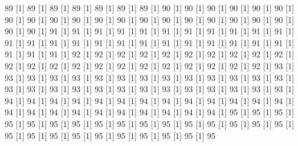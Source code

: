 \documentclass[12pt]{article}
\begin{document}
\begin{Schunk}
\begin{Soutput}
[1] 89%
[1] 89%
[1] 89%
[1] 89%
[1] 89%
[1] 89%
[1] 89%
[1] 90%
[1] 90%
[1] 90%
[1] 90%
[1] 90%
[1] 90%
[1] 90%
[1] 90%
[1] 90%
[1] 90%
[1] 90%
[1] 90%
[1] 90%
[1] 90%
[1] 90%
[1] 90%
[1] 90%
[1] 90%
[1] 90%
[1] 90%
[1] 90%
[1] 91%
[1] 91%
[1] 91%
[1] 91%
[1] 91%
[1] 91%
[1] 91%
[1] 91%
[1] 91%
[1] 91%
[1] 91%
[1] 91%
[1] 91%
[1] 91%
[1] 91%
[1] 91%
[1] 91%
[1] 91%
[1] 91%
[1] 91%
[1] 91%
[1] 91%
[1] 91%
[1] 91%
[1] 91%
[1] 91%
[1] 91%
[1] 92%
[1] 92%
[1] 92%
[1] 92%
[1] 92%
[1] 92%
[1] 92%
[1] 92%
[1] 92%
[1] 92%
[1] 92%
[1] 92%
[1] 92%
[1] 92%
[1] 92%
[1] 92%
[1] 92%
[1] 92%
[1] 92%
[1] 92%
[1] 92%
[1] 92%
[1] 93%
[1] 93%
[1] 93%
[1] 93%
[1] 93%
[1] 93%
[1] 93%
[1] 93%
[1] 93%
[1] 93%
[1] 93%
[1] 93%
[1] 93%
[1] 93%
[1] 93%
[1] 93%
[1] 93%
[1] 93%
[1] 93%
[1] 93%
[1] 93%
[1] 93%
[1] 93%
[1] 93%
[1] 93%
[1] 93%
[1] 93%
[1] 94%
[1] 94%
[1] 94%
[1] 94%
[1] 94%
[1] 94%
[1] 94%
[1] 94%
[1] 94%
[1] 94%
[1] 94%
[1] 94%
[1] 94%
[1] 94%
[1] 94%
[1] 94%
[1] 94%
[1] 94%
[1] 94%
[1] 94%
[1] 94%
[1] 94%
[1] 94%
[1] 95%
[1] 95%
[1] 95%
[1] 95%
[1] 95%
[1] 95%
[1] 95%
[1] 95%
[1] 95%
[1] 95%
[1] 95%
[1] 95%
[1] 95%
[1] 95%
[1] 95%
[1] 95%
[1] 95%
[1] 95%
[1] 95%
[1] 95%
[1] 95%
[1] 95%
[1] 95%
[1] 95%
[1] 95%
[1] 95%

\end{Soutput}
\end{Schunk}
\end{document}
